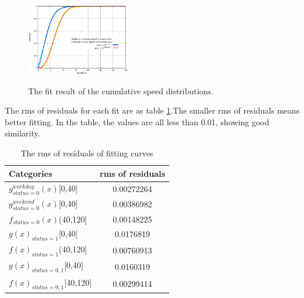 \begin{figure}[htbp]
\centering
\includegraphics[width=0.4\textwidth]{figures_201103/fit/speedfit.eps}\\
\caption{The fit result of the cumulative speed distributions.}\label{figure_fit_ccdf_speed}
\end{figure}

The rms of residuals for each fit are as table \ref{table_rms}.The smaller rms of residuals means better fitting. In the table, the values are all less than 0.01, showing good similarity.

\begin{table}[!t]
\caption{The rms of residuals of fitting curves}\label{table_rms}
\centering
\begin{tabular}{l|c}
  \hline
  Categories & rms of residuals  \\
  \hline
  $g_{status=0}^{workday}(x)$[0,40] & 0.00272264\\
  $g_{status=0}^{weekend}(x)$[0,40] & 0.00386982  \\
  $f_{status=0}(x)$(40,120] & 0.00148225\\
  $g(x)_{status=1}$[0,40]& 0.0176819 \\
  $f(x)_{status=1}$(40,120] & 0.00760913\\
  $g(x)_{status=0,1}$[0,40]& 0.0160319\\
  $f(x)_{status=0,1}$[40,120]& 0.00299414\\
  \hline
\end{tabular}
\end{table}

